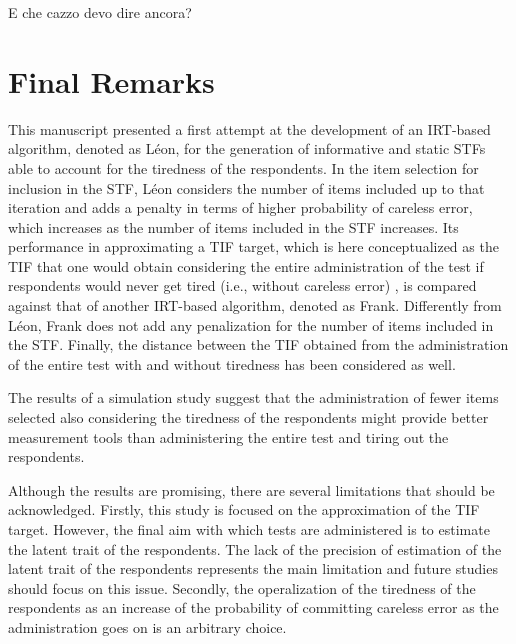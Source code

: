 \documentclass{svproc}
\begin{document}
E che cazzo devo dire ancora? 

\section{Final Remarks}

This manuscript presented a first attempt at the development of an IRT-based algorithm, denoted as Léon, for the generation of informative and static STFs able to account for the tiredness of the respondents. In the item selection for inclusion in the STF, Léon considers the number of items included up to that iteration and adds a penalty in terms of higher probability of careless error, which increases as the number of items included in the STF increases. Its performance in approximating a TIF target, which is here conceptualized as the TIF that one would obtain considering the entire administration of the test if respondents would never get tired (i.e., without careless error) , is compared against that of another IRT-based algorithm, denoted as Frank. Differently from Léon, Frank does not add any penalization for the number of items included in the STF. Finally, the distance between the TIF obtained from the administration of the entire test with and without tiredness has been considered as well. 

The results of a simulation study suggest that the administration of fewer items selected also considering the tiredness of the respondents might provide better measurement tools  than administering the entire test and tiring out the respondents. 

Although the results are promising, there are several limitations that should be acknowledged. Firstly, this study is focused on the approximation of the TIF target. However, the final aim with which tests are administered is to estimate the latent trait of the respondents. The lack of the precision of estimation of the latent trait of the respondents represents the main limitation and future studies should focus on this issue. 
Secondly, the operalization of the tiredness of the respondents as an increase of the probability of committing careless error as the administration goes on is an arbitrary choice.
\end{document}

